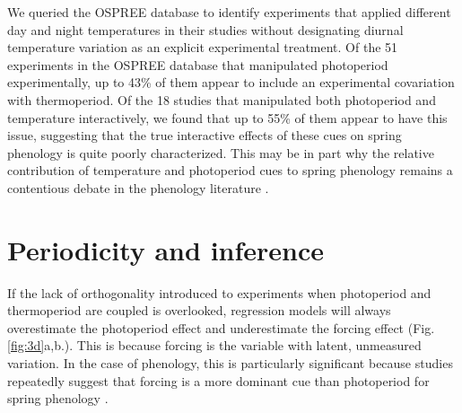 \documentclass[11pt]{article}
\begin{document}
We queried the OSPREE database to identify experiments that applied different day and night temperatures in their studies without designating diurnal temperature variation as an explicit experimental treatment. Of the 51 experiments in the OSPREE database that manipulated photoperiod experimentally, up to 43\% of them appear to include an experimental covariation with thermoperiod. Of the 18 studies that manipulated both photoperiod and temperature interactively, we found that up to 55\% of them appear to have this issue, suggesting that the true interactive effects of these cues on spring phenology is quite poorly characterized. This may be in part why the relative contribution of temperature and photoperiod cues to spring phenology remains a contentious debate in the phenology literature \citep{koerner2010a,CHUINE:2010wg,Jennifer:2010un}.

\section*{Periodicity and inference}
If the lack of orthogonality introduced to experiments when photoperiod and thermoperiod are coupled is overlooked, regression models will always overestimate the photoperiod effect and underestimate the forcing effect (Fig. \ref{fig:3d}a,b.). This is because forcing is the variable with latent, unmeasured variation. In the case of phenology, this is particularly significant because studies repeatedly suggest that forcing is a more dominant cue than photoperiod for spring phenology \citep{CHUINE:2010wg,Zohner:2016uz,Gauzere2019}.
\end{document}

